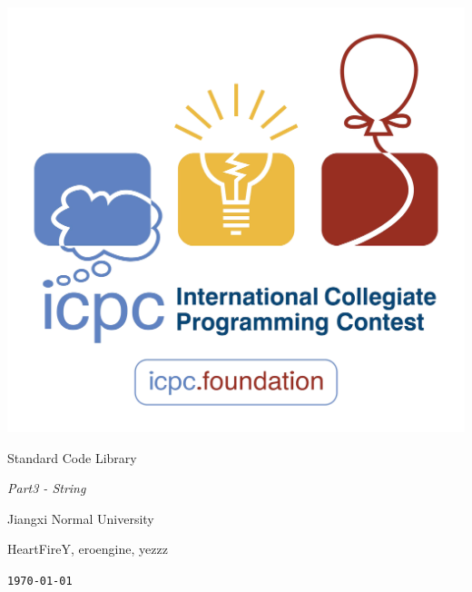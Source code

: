 \documentclass{article}
\begin{document}
\pagestyle{empty}
\begin{center}

    \includegraphics[width=.7\linewidth]{ICPC.png}
    
    \vspace{5em}
    
    \Huge{{Standard Code Library}}
    
    \vspace{2em}
    
    \huge{\textit{Part3 - String}}
    
    \vspace{2em}
    
    \Large{\textsf{Jiangxi Normal University}}
    
    \vspace{0.4em}
    
    \Large{\textsf{HeartFireY, eroengine, yezzz}}
    
    \vspace{0.6em}
    
    \texttt{\today}
    
\end{center}
\end{document}
